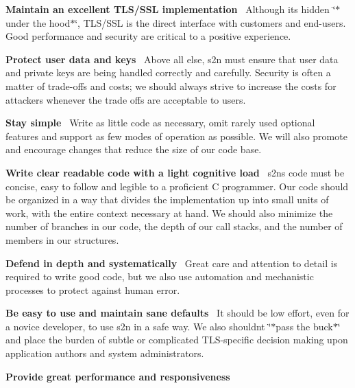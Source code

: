 \begin{DoxyItemize}
\item {\bfseries Maintain an excellent T\+L\+S/\+S\+SL implementation}~\newline
Although it\textquotesingle{}s hidden \char`\"{}$\ast$under the hood$\ast$\char`\"{}, T\+L\+S/\+S\+SL is the direct interface with customers and end-\/users. Good performance and security are critical to a positive experience.
\item {\bfseries Protect user data and keys}~\newline
Above all else, s2n must ensure that user data and private keys are being handled correctly and carefully. Security is often a matter of trade-\/offs and costs; we should always strive to increase the costs for attackers whenever the trade offs are acceptable to users.
\item {\bfseries Stay simple}~\newline
Write as little code as necessary, omit rarely used optional features and support as few modes of operation as possible. We will also promote and encourage changes that reduce the size of our code base.
\item {\bfseries Write clear readable code with a light cognitive load}~\newline
s2n\textquotesingle{}s code must be concise, easy to follow and legible to a proficient C programmer. Our code should be organized in a way that divides the implementation up into small units of work, with the entire context necessary at hand. We should also minimize the number of branches in our code, the depth of our call stacks, and the number of members in our structures.
\item {\bfseries Defend in depth and systematically}~\newline
Great care and attention to detail is required to write good code, but we also use automation and mechanistic processes to protect against human error.
\item {\bfseries Be easy to use and maintain sane defaults}~\newline
It should be low effort, even for a novice developer, to use s2n in a safe way. We also shouldn\textquotesingle{}t \char`\"{}$\ast$pass the buck$\ast$\char`\"{} and place the burden of subtle or complicated T\+L\+S-\/specific decision making upon application authors and system administrators.
\item {\bfseries Provide great performance and responsiveness}~\newline

\end{DoxyItemize}
